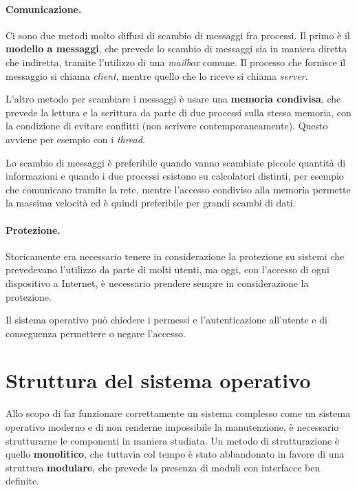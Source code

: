         \paragraph{Comunicazione.} Ci sono due metodi molto diffusi di scambio di messaggi fra processi. Il primo è il \textbf{modello a messaggi}, che prevede lo scambio di messaggi sia in maniera diretta che indiretta, tramite l'utilizzo di una \textit{mailbox} comune. Il processo che fornisce il messaggio si chiama \textit{client}, mentre quello che lo riceve si chiama \textit{server}.
        
        L'altro metodo per scambiare i messaggi è usare una \textbf{memoria condivisa}, che prevede la lettura e la scrittura da parte di due processi sulla stessa memoria, con la condizione di evitare conflitti (non scrivere contemporaneamente). Questo avviene per esempio con i \textit{thread}.
        
        Lo scambio di messaggi è preferibile quando vanno scambiate piccole quantità di informazioni e quando i due processi esistono su calcolatori distinti, per esempio che comunicano tramite la rete, mentre l'accesso condiviso alla memoria permette la massima velocità ed è quindi preferibile per grandi scambi di dati.
        
        \paragraph{Protezione.} Storicamente era necessario tenere in considerazione la protezione su sistemi che prevedevano l'utilizzo da parte di molti utenti, ma oggi, con l'accesso di ogni dispositivo a Internet, è necessario prendere sempre in considerazione la protezione.
        
        Il sistema operativo può chiedere i permessi e l'autenticazione all'utente e di conseguenza permettere o negare l'accesso.
        
\section{Struttura del sistema operativo}
    Allo scopo di far funzionare correttamente un sistema complesso come un sistema operativo moderno e di non renderne impossibile la manutenzione, è necessario strutturarne le componenti in maniera studiata. Un metodo di strutturazione è quello \textbf{monolitico}, che tuttavia col tempo è stato abbandonato in favore di una struttura \textbf{modulare}, che prevede la presenza di moduli con interfacce ben definite.
    
